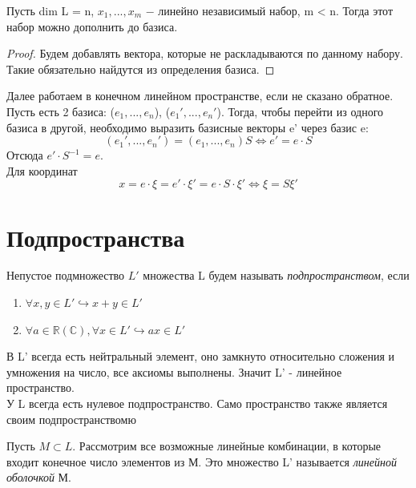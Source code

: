 \begin{lemma}
    Пусть dim L = n, $x_1, ..., x_m$ $-$ линейно независимый набор, m < n. Тогда этот набор можно дополнить до базиса.
\end{lemma}
\begin{proof}
    Будем добавлять вектора, которые не раскладываются по данному набору. Такие обязательно найдутся из определения базиса.
\end{proof}

Далее работаем в конечном линейном пространстве, если не сказано обратное.\\

Пусть есть 2 базиса: ($e_1, ..., e_n$), ($e_1', ..., e_n'$). Тогда, чтобы перейти из одного базиса в другой, необходимо выразить базисные векторы e' через базис e:
\[
(e_1', ..., e_n') = (e_1, ..., e_n) S \Longleftrightarrow e' = e\cdot S
\]
Отсюда $e'\cdot S^{-1} = e$.\\

Для координат
\[
x = e\cdot \xi = e' \cdot \xi' = e \cdot S \cdot \xi' \Longleftrightarrow \xi = S\xi'
\]

\section{Подпространства}

\begin{definition}
    Непустое подмножество $L'$ множества L будем называть \textit{подпространством}, если

    \begin{enumerate}
        \item $\forall x,y \in L' \hookrightarrow x + y \in L'$
        \item $\forall a \in \mathbb{R} (\mathbb{C}), \forall x \in L' \hookrightarrow a x \in L'$
    \end{enumerate}
    
\end{definition}

В L' всегда есть нейтральный элемент, оно замкнуто относительно сложения и умножения на число, все аксиомы выполнены. Значит L' - линейное пространство.\\

У L всегда есть нулевое подпространство. Само пространство также является своим подпространствомю\\

\begin{definition}
Пусть $M\subset L$. Рассмотрим все возможные линейные комбинации, в которые входит конечное число элементов из М. Это множество L' называется \textit{линейной оболочкой} М.  
\end{definition}

